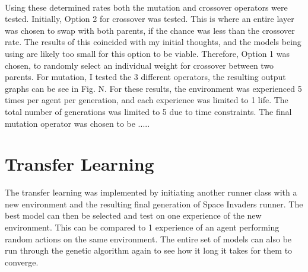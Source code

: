 \paragraph{}


Using these determined rates both the mutation and crossover operators were tested. Initially, Option 2 for crossover was tested. This is where an entire layer was chosen to swap with both parents, if the chance was less than the crossover rate. The results of this coincided with my initial thoughts, and the models being using are likely too small for this option to be viable. Therefore, Option 1 was chosen, to randomly select an individual weight for crossover between two parents. For mutation, I tested the 3 different operators, the resulting output graphs can be see in Fig. N. For these results, the environment was experienced 5 times per agent per generation, and each experience was limited to 1 life. The total number of generations was limited to 5 due to time constraints. The final mutation operator was chosen to be .....


\section{Transfer Learning}

The transfer learning was implemented by initiating another runner class with a new environment and the resulting final generation of Space Invaders runner. The best model can then be selected and test on one experience of the new environment. This can be compared to 1 experience of an agent performing random actions on the same environment. The entire set of models can also be run through the genetic algorithm again to see how it long it takes for them to converge.

